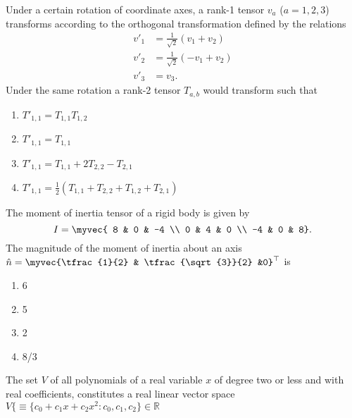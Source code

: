 \item Under a certain rotation of coordinate axes, a rank-1 tensor $v_a$ ($a=1,2,3$) transforms according to the orthogonal transformation defined by the relations
	\begin{align*}	 v'_1 &= \frac{1}{\sqrt{2}}(v_1 + v_2)\\ v'_2 &=\frac{1}{\sqrt{2}}(-v_1 + v_2) \\ v'_3 &= v_3.\end{align*}
Under the same rotation a rank-2 tensor $T_{a,b}$ would transform such that
\hfill{}
\begin{multicols}{2}
	\begin{enumerate}[itemsep=1ex]
        \item $T'_{1,1} = T_{1,1}  T_{1,2}$
        \item $T'_{1,1} = T_{1,1}$
        \item $T'_{1,1} = T_{1,1} + 2T_{2,2} - T_{2,1}$
        \item $T'_{1,1} = \tfrac{1}{2}(T_{1,1} + T_{2,2} + T_{1,2} + T_{2,1})$
    \end{enumerate}
\end{multicols}
\item The moment of inertia tensor of a rigid body is given by
$$I = \myvec{
8 & 0 & -4 \\
0 & 4 & 0 \\
-4 & 0 & 8}.
$$ The magnitude of the moment of inertia about an axis $\hat{n} = \myvec{\tfrac{1}{2} & \tfrac{\sqrt{3}}{2} &0}^{\top}$ is

\hfill{}
\begin{multicols}{4}
    \begin{enumerate}
        \item 6
        \item 5
        \item 2
        \item 8/3
    \end{enumerate}
\end{multicols}
\item 
The set $V$ of all polynomials of a real variable $x$ of degree two or less and with real coefficients, constitutes a real linear vector space $V \{\equiv \{ c_{0} + c_{1}x + c_{2}x^{2} : c_{0}, c_{1}, c_{2}\} \in \mathbb{R}$ 

